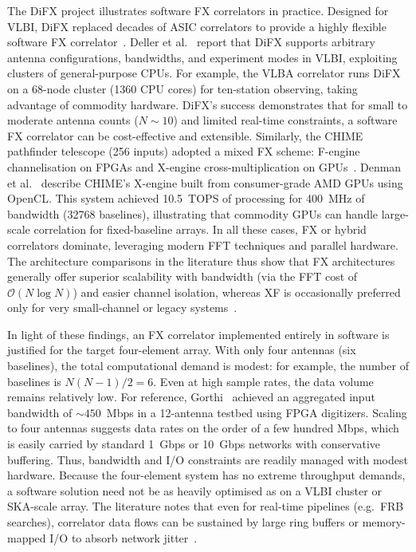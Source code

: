 The DiFX project illustrates software FX correlators in practice. Designed for VLBI, DiFX replaced decades of ASIC correlators to provide a highly flexible software FX correlator~\cite{Deller2011}. Deller et al.~\cite{Deller2011} report that DiFX supports arbitrary antenna configurations, bandwidths, and experiment modes in VLBI, exploiting clusters of general-purpose CPUs. For example, the VLBA correlator runs DiFX on a 68-node cluster (1360 CPU cores) for ten-station observing, taking advantage of commodity hardware. DiFX’s success demonstrates that for small to moderate antenna counts (\( N \sim 10 \)) and limited real-time constraints, a software FX correlator can be cost-effective and extensible. Similarly, the CHIME pathfinder telescope (256 inputs) adopted a mixed FX scheme: F-engine channelisation on FPGAs and X-engine cross-multiplication on GPUs~\cite{Denman2015}. Denman et al.~\cite{Denman2015} describe CHIME’s X-engine built from consumer-grade AMD GPUs using OpenCL. This system achieved 10.5~TOPS of processing for 400~MHz of bandwidth (32768 baselines), illustrating that commodity GPUs can handle large-scale correlation for fixed-baseline arrays. In all these cases, FX or hybrid correlators dominate, leveraging modern FFT techniques and parallel hardware. The architecture comparisons in the literature thus show that FX architectures generally offer superior scalability with bandwidth (via the FFT cost of \( \mathcal{O}(N\log N) \)) and easier channel isolation, whereas XF is occasionally preferred only for very small-channel or legacy systems~\cite{Escoffier2007, Denman2015, Iguchi2008}.

In light of these findings, an FX correlator implemented entirely in software is justified for the target four-element array. With only four antennas (six baselines), the total computational demand is modest: for example, the number of baselines is \( N(N-1)/2 = 6 \). Even at high sample rates, the data volume remains relatively low. For reference, Gorthi~\cite{Gorthi2021} achieved an aggregated input bandwidth of \(\sim450\)~Mbps in a 12-antenna testbed using FPGA digitizers. Scaling to four antennas suggests data rates on the order of a few hundred Mbps, which is easily carried by standard 1~Gbps or 10~Gbps networks with conservative buffering. Thus, bandwidth and I/O constraints are readily managed with modest hardware. Because the four-element system has no extreme throughput demands, a software solution need not be as heavily optimised as on a VLBI cluster or SKA-scale array. The literature notes that even for real-time pipelines (e.g.\ FRB searches), correlator data flows can be sustained by large ring buffers or memory-mapped I/O to absorb network jitter~\cite{Leung2024, Merry2023}.

